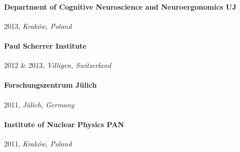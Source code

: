 \paragraph{Department of Cognitive Neuroscience and Neuroergonomics UJ} 2013, \emph{Kraków, Poland}
\paragraph{Paul Scherrer Institute} 2012 \& 2013, \emph{Villigen, Switzerland}
\paragraph{Forschungszentrum Jülich} 2011, \emph{Jülich, Germany}
\paragraph{Institute of Nuclear Physics PAN} 2011, \emph{Kraków, Poland}



\endgroup
